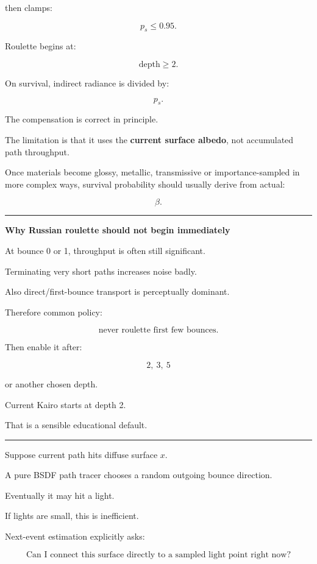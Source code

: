 then clamps:

\[
p_s\le0.95.
\]

Roulette begins at:

\[
\text{depth}\ge2.
\]

On survival, indirect radiance is divided by:

\[
p_s.
\]

The compensation is correct in principle.

The limitation is that it uses the \textbf{current surface albedo}, not accumulated path throughput.

Once materials become glossy, metallic, transmissive or importance-sampled in more complex ways, survival probability should usually derive from actual:

\[
\beta.
\]

\begin{center}\rule{0.5\linewidth}{0.5pt}\end{center}

\textbf{Why Russian roulette should not begin immediately}

At bounce 0 or 1, throughput is often still significant.

Terminating very short paths increases noise badly.

Also direct/first-bounce transport is perceptually dominant.

Therefore common policy:

\[
\text{never roulette first few bounces}.
\]

Then enable it after:

\[
2,\ 3,\ 5
\]

or another chosen depth.

Current Kairo starts at depth 2.

That is a sensible educational default.

\begin{center}\rule{0.5\linewidth}{0.5pt}\end{center}

Suppose current path hits diffuse surface \(x\).

A pure BSDF path tracer chooses a random outgoing bounce direction.

Eventually it may hit a light.

If lights are small, this is inefficient.

Next-event estimation explicitly asks:

\[
\boxed{
\text{Can I connect this surface directly to a sampled light point right now?}
}
\]

